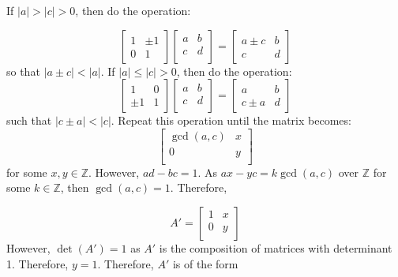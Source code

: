 \documentclass{article}
\theoremstyle{definition}
\numberwithin{theorem}{section}
\numberwithin{equation}{section}
\begin{document}
If $|a| > |c| > 0$, then do the operation:

\begin{equation*}
    \begin{bmatrix}
        1 & \pm 1\\
        0 & 1
    \end{bmatrix}
    \begin{bmatrix}
        a & b\\
        c & d\\
    \end{bmatrix}
    = 
    \begin{bmatrix}
        a \pm c &b\\
        c & d
    \end{bmatrix}
\end{equation*}
so that $|a \pm c| < |a|$.
If $|a| \leq |c| > 0$, then do the operation:
\begin{equation*}
    \begin{bmatrix}
        1 & 0\\
        \pm 1 & 1
    \end{bmatrix}
    \begin{bmatrix}
        a & b\\
        c & d\\
    \end{bmatrix}
    = 
    \begin{bmatrix}
        a &b\\
        c \pm a & d
    \end{bmatrix}
\end{equation*}
such that $|c \pm a| < |c|$. Repeat this operation until the matrix becomes:
\begin{equation*}
    \begin{bmatrix}
        \gcd(a, c) & x\\
        0 & y\\
    \end{bmatrix}
\end{equation*}
for some $x, y \in \mathbb{Z}$. However, $ad - bc = 1$. As $ax - yc = k \gcd(a, c)$ over $\mathbb{Z}$ for some $k \in \mathbb{Z}$, then $\gcd(a, c) = 1$. Therefore, 

\begin{equation*}
    A' = \begin{bmatrix}
        1 & x\\
        0 & y\\
    \end{bmatrix}
\end{equation*}
However, $\det(A') = 1$ as $A'$ is the composition of matrices with determinant 1. Therefore, $y = 1$. Therefore, $A'$ is of the form
\end{document}

